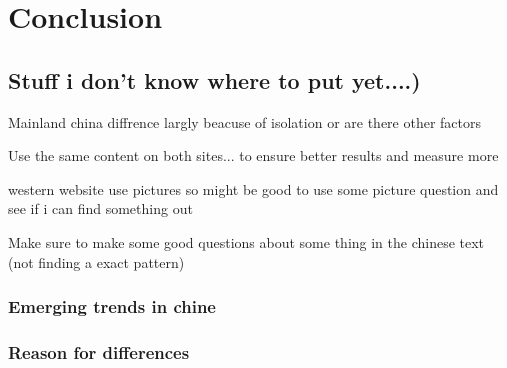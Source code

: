 
\chapter{Conclusion} %

\label{Chapter9} %




\section{Stuff i don't know where to put yet....)}
Mainland china diffrence largly beacuse of isolation or are there other factors

Use the same content on both sites... to ensure better results and measure more

western website use pictures so might be good to use some picture question and see if i can find something out

Make sure to make some good questions about some thing in the chinese text (not finding a exact pattern)
 \subsection{Emerging trends in chine}
 \subsection{Reason for differences}




